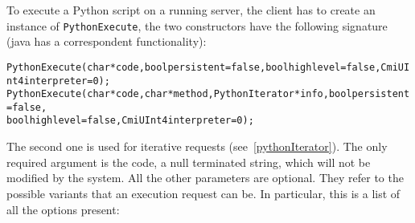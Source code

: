 To execute a Python script on a running server, the client has to create an
instance of \texttt{PythonExecute}, the two constructors have the following
signature (java has a correspondent functionality):

\begin{alltt}
PythonExecute(char *code, bool persistent=false, bool highlevel=false, CmiUInt4 interpreter=0);
PythonExecute(char *code, char *method, PythonIterator *info, bool persistent=false,
              bool highlevel=false, CmiUInt4 interpreter=0);
\end{alltt}

The second one is used for iterative requests (see~\ref{pythonIterator}). The
only required argument is the code, a null terminated string, which will not be
modified by the system. All the other parameters are optional. They refer to the
possible variants that an execution request can be. In particular, this is a
list of all the options present:

